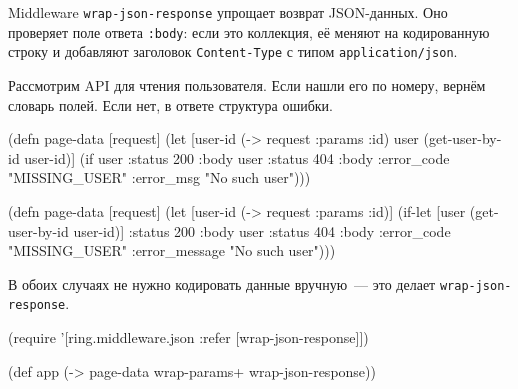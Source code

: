 \begin{english}
  \begin{clojure}
  \end{clojure}
\end{english}


Middleware \verb|wrap-json-response| упрощает возврат JSON-данных. Оно проверяет
поле ответа \verb|:body|: если это коллекция, её меняют на кодированную строку и
добавляют заголовок \verb|Content-Type| с типом \verb|application/json|.

Рассмотрим API для чтения пользователя. Если нашли его по номеру, вернём
словарь полей. Если нет, в ответе структура ошибки.

\ifx\DEVICETYPE\MOBILE

\begin{english}
  \begin{clojure}
(defn page-data [request]
  (let [user-id (-> request :params :id)
        user (get-user-by-id user-id)]
    (if user
      {:status 200 :body user}
      {:status 404
       :body
       {:error_code "MISSING_USER"
        :error_msg "No such user"}})))
  \end{clojure}
\end{english}

\else

\begin{english}
  \begin{clojure}
(defn page-data [request]
  (let [user-id (-> request :params :id)]
    (if-let [user (get-user-by-id user-id)]
      {:status 200 :body user}
      {:status 404
       :body {:error_code "MISSING_USER"
              :error_message "No such user"}})))
  \end{clojure}
\end{english}

\fi

\noindent
В обоих случаях не нужно кодировать данные вручную~--- это делает
\verb|wrap-json-response|.

\begin{english}
  \begin{clojure}
(require '[ring.middleware.json
           :refer [wrap-json-response]])

(def app (-> page-data
             wrap-params+
             wrap-json-response))
  \end{clojure}
\end{english}

